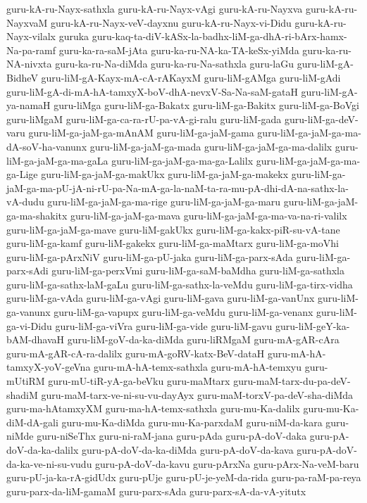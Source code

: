 {guru-kA-ru-Nayx-sathxla
guru-kA-ru-Nayx-vAgi
guru-kA-ru-Nayxva
guru-kA-ru-NayxvaM
guru-kA-ru-Nayx-veV-dayxnu
guru-kA-ru-Nayx-vi-Didu
guru-kA-ru-Nayx-vilalx
guruka
guru-kaq-ta-diV-kASx-la-badhx-liM-ga-dhA-ri-bArx-hamx-Na-pa-ramf
guru-ka-ra-saM-jAta
guru-ka-ru-NA-ka-TA-keSx-yiMda
guru-ka-ru-NA-nivxta
guru-ka-ru-Na-diMda
guru-ka-ru-Na-sathxla
guru-laGu
guru-liM-gA-BidheV
guru-liM-gA-Kayx-mA-cA-rAKayxM
guru-liM-gAMga
guru-liM-gAdi
guru-liM-gA-di-mA-hA-tamxyX-boV-dhA-nevxV-Sa-Na-saM-gataH
guru-liM-gA-ya-namaH
guru-liMga
guru-liM-ga-Bakatx
guru-liM-ga-Bakitx
guru-liM-ga-BoVgi
guru-liMgaM
guru-liM-ga-ca-ra-rU-pa-vA-gi-ralu
guru-liM-gada
guru-liM-ga-deV-varu
guru-liM-ga-jaM-ga-mAnAM
guru-liM-ga-jaM-gama
guru-liM-ga-jaM-ga-ma-dA-soV-ha-vanunx
guru-liM-ga-jaM-ga-mada
guru-liM-ga-jaM-ga-ma-dalilx
guru-liM-ga-jaM-ga-ma-gaLa
guru-liM-ga-jaM-ga-ma-ga-Lalilx
guru-liM-ga-jaM-ga-ma-ga-Lige
guru-liM-ga-jaM-ga-makUkx
guru-liM-ga-jaM-ga-makekx
guru-liM-ga-jaM-ga-ma-pU-jA-ni-rU-pa-Na-mA-ga-la-naM-ta-ra-mu-pA-dhi-dA-na-sathx-la-vA-dudu
guru-liM-ga-jaM-ga-ma-rige
guru-liM-ga-jaM-ga-maru
guru-liM-ga-jaM-ga-ma-shakitx
guru-liM-ga-jaM-ga-mava
guru-liM-ga-jaM-ga-ma-va-na-ri-valilx
guru-liM-ga-jaM-ga-mave
guru-liM-gakUkx
guru-liM-ga-kakx-piR-su-vA-tane
guru-liM-ga-kamf
guru-liM-gakekx
guru-liM-ga-maMtarx
guru-liM-ga-moVhi
guru-liM-ga-pArxNiV
guru-liM-ga-pU-jaka
guru-liM-ga-parx-sAda
guru-liM-ga-parx-sAdi
guru-liM-ga-perxVmi
guru-liM-ga-saM-baMdha
guru-liM-ga-sathxla
guru-liM-ga-sathx-laM-gaLu
guru-liM-ga-sathx-la-veMdu
guru-liM-ga-tirx-vidha
guru-liM-ga-vAda
guru-liM-ga-vAgi
guru-liM-gava
guru-liM-ga-vanUnx
guru-liM-ga-vanunx
guru-liM-ga-vapupx
guru-liM-ga-veMdu
guru-liM-ga-venanx
guru-liM-ga-vi-Didu
guru-liM-ga-viVra
guru-liM-ga-vide
guru-liM-gavu
guru-liM-geY-ka-bAM-dhavaH
guru-liM-goV-da-ka-diMda
guru-liRMgaM
guru-mA-gAR-cAra
guru-mA-gAR-cA-ra-dalilx
guru-mA-goRV-katx-BeV-dataH
guru-mA-hA-tamxyX-yoV-geVna
guru-mA-hA-temx-sathxla
guru-mA-hA-temxyu
guru-mUtiRM
guru-mU-tiR-yA-ga-beVku
guru-maMtarx
guru-maM-tarx-du-pa-deV-shadiM
guru-maM-tarx-ve-ni-su-vu-dayAyx
guru-maM-torxV-pa-deV-sha-diMda
guru-ma-hAtamxyXM
guru-ma-hA-temx-sathxla
guru-mu-Ka-dalilx
guru-mu-Ka-diM-dA-gali
guru-mu-Ka-diMda
guru-mu-Ka-parxdaM
guru-niM-da-kara
guru-niMde
guru-niSeThx
guru-ni-raM-jana
guru-pAda
guru-pA-doV-daka
guru-pA-doV-da-ka-dalilx
guru-pA-doV-da-ka-diMda
guru-pA-doV-da-kava
guru-pA-doV-da-ka-ve-ni-su-vudu
guru-pA-doV-da-kavu
guru-pArxNa
guru-pArx-Na-veM-baru
guru-pU-ja-ka-rA-gidUdx
guru-pUje
guru-pU-je-yeM-da-rida
guru-pa-raM-pa-reya
guru-parx-da-liM-gamaM
guru-parx-sAda
guru-parx-sA-da-vA-yitutx
}
